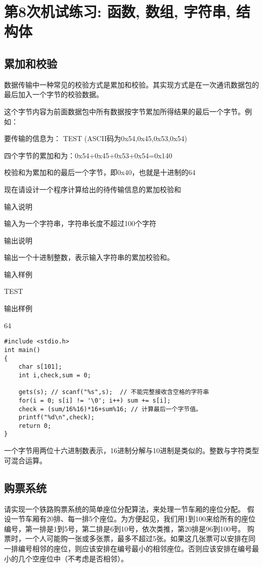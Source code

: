 %
%
%
\chapter{第8次机试练习: 函数, 数组, 字符串, 结构体}

\section{累加和校验}
数据传输中一种常见的校验方式是累加和校验。其实现方式是在一次通讯数据包的最后加入一个字节的校验数据。

这个字节内容为前面数据包中所有数据按字节累加所得结果的最后一个字节。例如： 

要传输的信息为： TEST (ASCII码为0x54,0x45,0x53,0x54)

四个字节的累加和为：0x54+0x45+0x53+0x54=0x140 

校验和为累加和的最后一个字节，即0x40，也就是十进制的64 

现在请设计一个程序计算给出的待传输信息的累加校验和 

输入说明

输入为一个字符串，字符串长度不超过100个字符

输出说明

输出一个十进制整数，表示输入字符串的累加校验和。

输入样例

TEST

输出样例

64

\begin{lstlisting}
#include <stdio.h>
int main()
{
	char s[101];
	int i,check,sum = 0; 
	
	gets(s); // scanf("%s",s);  // 不能完整接收含空格的字符串 
	for(i = 0; s[i] != '\0'; i++) sum += s[i];
	check = (sum/16%16)*16+sum%16; // 计算最后一个字节值。
	printf("%d\n",check);
	return 0;
}
\end{lstlisting}

\begin{note}[要点]
	一个字节用两位十六进制数表示，16进制分解与10进制是类似的。整数与字符类型可混合运算。
\end{note}

\section{购票系统}
请实现一个铁路购票系统的简单座位分配算法，来处理一节车厢的座位分配。 
假设一节车厢有20排、每一排5个座位。为方便起见，我们用1到100来给所有的座位编号，第一排是1到5号，第二排是6到10号，依次类推，第20排是96到100号。 
购票时，一个人可能购一张或多张票，最多不超过5张。如果这几张票可以安排在同一排编号相邻的座位，则应该安排在编号最小的相邻座位。否则应该安排在编号最小的几个空座位中（不考虑是否相邻）。 


